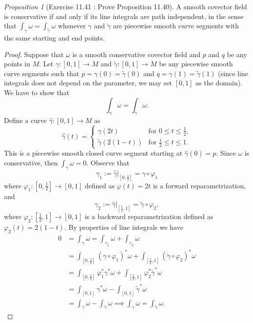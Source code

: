 \documentclass[a4paper]{article}
\theoremstyle{remark}
\newtheorem{prop}{Proposition}
\newcommand\wtilde[1]{\widetilde{#1}} %
\newcommand{\seperdua}{\frac{1}{2}} %
\begin{document}
\begin{prop}[Exercise 11.41 : Prove Proposition 11.40]
A smooth covector field is conservative if and only if its line integrals are path independent, in the sense that $\int_{\gamma} \omega = \int_{\wtilde{\gamma}} \omega $ whenever $\gamma$ and $\wtilde{\gamma}$ are piecewise smooth curve segments with the same starting and end points.
\end{prop}
\begin{proof}
Suppose that $\omega$ is a smooth conservative covector field and $p$ and $q$ be any points in $M$. Let $\gamma : [0,1] \to M$ and $\wtilde{\gamma} : [0,1] \to M$ be any piecewise smooth curve segments such that $p=\gamma(0) = \wtilde{\gamma}(0)$ and $q=\gamma(1) = \wtilde{\gamma} (1)$ (since line integrals does not depend on the parameter, we may set $[0,1]$ as the domain). We have to show that
$$
\int_{\gamma} \omega = \int_{\wtilde{\gamma}} \omega.
$$
Define a curve $\hat{\gamma} : [0,1] \to M$ as
$$
\hat{\gamma}(t) = 
\begin{cases}
\gamma(2t) & \text{for } 0 \leq t \leq \seperdua,\\
\wtilde{\gamma}(2(1-t)) & \text{for } \seperdua \leq t \leq 1.
\end{cases}
$$
This is a piecewise smooth closed curve segment starting at $\hat{\gamma}(0) = p$. Since $\omega$ is conservative, then $\int_{\hat{\gamma}} \omega = 0$. Observe that
$$
\gamma_1 := \hat{\gamma}|_{[0,\seperdua]} = \gamma \circ \varphi_1
$$
where $\varphi_1 :[0,\seperdua] \to [0,1]$ defined as $\varphi(t) = 2t$ is a forward reparametrization, and
$$
\gamma_2:= \hat{\gamma}|_{[\seperdua,1]} = \wtilde{\gamma} \circ \varphi_2, 
$$
where $\varphi_2 :[\seperdua,1] \to [0,1]$ is a backward reparametrization defined as $\varphi_2(t) = 2(1-t)$. By properties of line integrals we have
\begin{align*}
0 &= \int_{\hat{\gamma}} \omega = \int_{\gamma_1} \omega + \int_{\gamma_2} \omega \\ &= \int_{[0,\seperdua]} (\gamma \circ \varphi_1)^* \omega + \int_{[\seperdua,1]} (\wtilde{\gamma} \circ \varphi_2)^* \omega \\ &= \int_{[0,\seperdua]} \varphi_1^* \gamma^* \omega + \int_{[\seperdua,1]} \varphi_2^* \wtilde{\gamma}^* \omega \\  &= \int_{[0,1]} \gamma^* \omega - \int_{[0,1]} \wtilde{\gamma}^* \omega \\ &= \int_{\gamma} \omega - \int_{\wtilde{\gamma}} \omega \implies \int_{\gamma} \omega = \int_{\wtilde{\gamma}} \omega.
\end{align*}


\end{proof}
\end{document}
